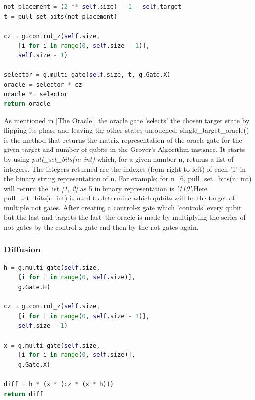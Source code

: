 \documentclass{article}
\begin{document}
\begin{file}
\begin{lstlisting}[language=Python]
not_placement = (2 ** self.size) - 1 - self.target
t = pull_set_bits(not_placement)

cz = g.control_z(self.size, 
	[i for i in range(0, self.size - 1)],
	self.size - 1)
	
selector = g.multi_gate(self.size, t, g.Gate.X)
oracle = selector * cz
oracle *= selector
return oracle

\end{lstlisting}
\end{file}

As mentioned in \ref{The Oracle}, the oracle gate 'selects' the chosen target state by flipping its phase and leaving the other states untouched. single\_target\_oracle() is the method that returns the matrix representation of the oracle gate for the given target and number of qubits in the Grover's Algorithm instance. It starts by using \textit{pull\_set\_bits(n: int)} which, for a given number n, returns a list of integers. The integers returned are the indexes (from right to left) of each '1' in the binary string representation of n. For example; for n=6, pull\_set\_bits(n: int) will return the list \textit{[1, 2]} as 5 in binary representation is \textit{'110'}.Here pull\_set\_bits(n: int) is used to determine which qubits will be the target of multiple not gates. After creating a control-z gate which 'controls' every qubit but the last and targets the last, the oracle is made by multiplying the series of not gates by the control-z gate and then by the not gates again.



\subsubsection{Diffusion}

\begin{file}
\begin{lstlisting}[language=Python]
h = g.multi_gate(self.size, 
	[i for i in range(0, self.size)], 
	g.Gate.H)
			
cz = g.control_z(self.size, 
	[i for i in range(0, self.size - 1)], 
	self.size - 1)
			
x = g.multi_gate(self.size, 
	[i for i in range(0, self.size)], 
	g.Gate.X)
			
diff = h * (x * (cz * (x * h)))
return diff

\end{lstlisting}
\end{file}
\end{document}
